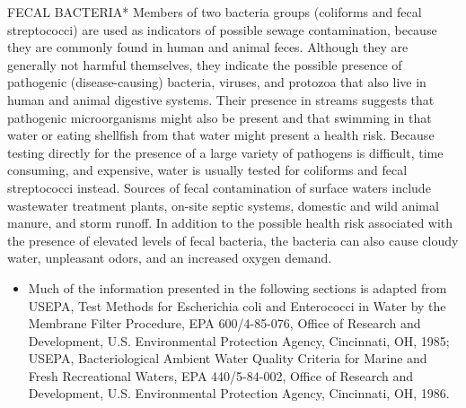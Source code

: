 \documentclass{article}
\begin{document}
FECAL BACTERIA* Members of two bacteria groups (coliforms and fecal
streptococci) are used as indicators of possible sewage contamination,
because they are commonly found in human and animal feces. Although they
are generally not harmful themselves, they indicate the possible
presence of pathogenic (disease-causing) bacteria, viruses, and protozoa
that also live in human and animal digestive systems. Their presence in
streams suggests that pathogenic microorganisms might also be present
and that swimming in that water or eating shellfish from that water
might present a health risk. Because testing directly for the presence
of a large variety of pathogens is difficult, time consuming, and
expensive, water is usually tested for coliforms and fecal streptococci
instead. Sources of fecal contamination of surface waters include
wastewater treatment plants, on-site septic systems, domestic and wild
animal manure, and storm runoff. In addition to the possible health risk
associated with the presence of elevated levels of fecal bacteria, the
bacteria can also cause cloudy water, unpleasant odors, and an increased
oxygen demand.

\begin{itemize}
\tightlist
\item
  Much of the information presented in the following sections is adapted
  from USEPA, Test Methods for Escherichia coli and Enterococci in Water
  by the Membrane Filter Procedure, EPA 600/4-85-076, Office of Research
  and Development, U.S. Environmental Protection Agency, Cincinnati, OH,
  1985; USEPA, Bacteriological Ambient Water Quality Criteria for Marine
  and Fresh Recreational Waters, EPA 440/5-84-002, Office of Research
  and Development, U.S. Environmental Protection Agency, Cincinnati, OH,
  1986.
\end{itemize}
\end{document}
